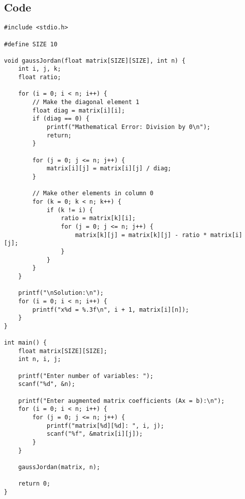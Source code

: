 \documentclass[12pt,a4paper]{article}
\begin{document}
\subsection*{Code}
\begin{lstlisting}
#include <stdio.h>

#define SIZE 10

void gaussJordan(float matrix[SIZE][SIZE], int n) {
    int i, j, k;
    float ratio;

    for (i = 0; i < n; i++) {
        // Make the diagonal element 1
        float diag = matrix[i][i];
        if (diag == 0) {
            printf("Mathematical Error: Division by 0\n");
            return;
        }

        for (j = 0; j <= n; j++) {
            matrix[i][j] = matrix[i][j] / diag;
        }

        // Make other elements in column 0
        for (k = 0; k < n; k++) {
            if (k != i) {
                ratio = matrix[k][i];
                for (j = 0; j <= n; j++) {
                    matrix[k][j] = matrix[k][j] - ratio * matrix[i][j];
                }
            }
        }
    }

    printf("\nSolution:\n");
    for (i = 0; i < n; i++) {
        printf("x%d = %.3f\n", i + 1, matrix[i][n]);
    }
}

int main() {
    float matrix[SIZE][SIZE];
    int n, i, j;

    printf("Enter number of variables: ");
    scanf("%d", &n);

    printf("Enter augmented matrix coefficients (Ax = b):\n");
    for (i = 0; i < n; i++) {
        for (j = 0; j <= n; j++) {
            printf("matrix[%d][%d]: ", i, j);
            scanf("%f", &matrix[i][j]);
        }
    }

    gaussJordan(matrix, n);

    return 0;
}
\end{lstlisting}
\end{document}
